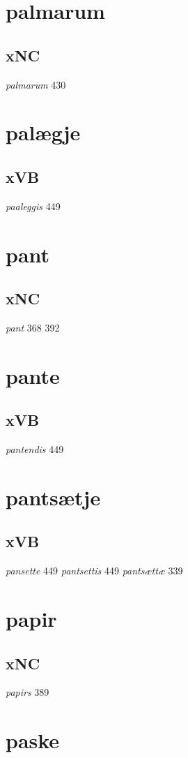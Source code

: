 \documentclass[a4paper,twocolumn]{article}
\begin{document}
\section{palmarum}
\label{sec:org194f3a6}
\subsection{xNC}
\label{sec:orgf66fad1}
\emph{palmarum} 430 
\section{palægje}
\label{sec:org6051bbc}
\subsection{xVB}
\label{sec:orgf4b1481}
\emph{paaleggis} 449 
\section{pant}
\label{sec:org8bba539}
\subsection{xNC}
\label{sec:org2248075}
\emph{pant} 368 392 
\section{pante}
\label{sec:org2f033a7}
\subsection{xVB}
\label{sec:org59f8f25}
\emph{pantendis} 449 
\section{pantsætje}
\label{sec:org6cded61}
\subsection{xVB}
\label{sec:org6c3abb9}
\emph{pansette} 449 \emph{pantsettis} 449 \emph{pantsættæ} 339 
\section{papir}
\label{sec:org2b1c739}
\subsection{xNC}
\label{sec:org72f276a}
\emph{papirs} 389 
\section{paske}
\label{sec:org14e1223}
\end{document}
